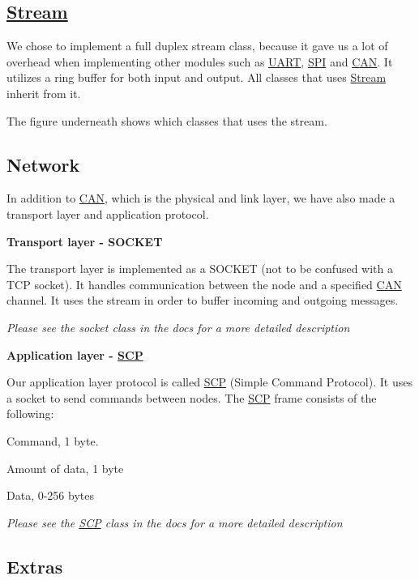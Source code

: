 \subsection*{\hyperlink{class_stream}{Stream}}

We chose to implement a full duplex stream class, because it gave us a lot of overhead when implementing other modules such as \hyperlink{class_u_a_r_t}{U\+A\+RT}, \hyperlink{namespace_s_p_i}{S\+PI} and \hyperlink{class_c_a_n}{C\+AN}. It utilizes a ring buffer for both input and output. All classes that uses \hyperlink{class_stream}{Stream} inherit from it.

The figure underneath shows which classes that uses the stream.



\subsection*{Network}

In addition to \hyperlink{class_c_a_n}{C\+AN}, which is the physical and link layer, we have also made a transport layer and application protocol.

{\bfseries Transport layer -\/ S\+O\+C\+K\+ET}

The transport layer is implemented as a S\+O\+C\+K\+ET (not to be confused with a T\+CP socket). It handles communication between the node and a specified \hyperlink{class_c_a_n}{C\+AN} channel. It uses the stream in order to buffer incoming and outgoing messages.

{\itshape Please see the socket class in the docs for a more detailed description}

{\bfseries Application layer -\/ \hyperlink{class_s_c_p}{S\+CP}}

Our application layer protocol is called \hyperlink{class_s_c_p}{S\+CP} (Simple Command Protocol). It uses a socket to send commands between nodes. The \hyperlink{class_s_c_p}{S\+CP} frame consists of the following\+:


\begin{DoxyItemize}
\item Command, 1 byte.
\item Amount of data, 1 byte
\item Data, 0-\/256 bytes
\end{DoxyItemize}

{\itshape Please see the \hyperlink{class_s_c_p}{S\+CP} class in the docs for a more detailed description}

\subsection*{Extras}

